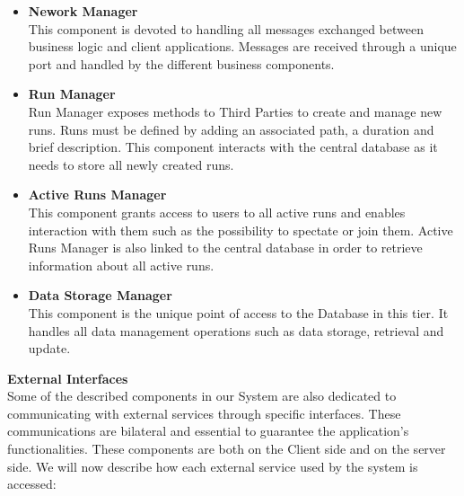 \documentclass[titlepage]{article}
\begin{document}
\begin{itemize}
        \item {\bf Nework Manager }\\
        This component is devoted to handling all messages exchanged between business logic and client applications. Messages are received through a unique port and handled by the different business components.
		\item {\bf Run Manager }\\
		Run Manager exposes methods to Third Parties  to create and manage new runs. Runs must be defined by adding an associated path, a duration and brief description. This component interacts with the central database as it needs to store all newly created runs.
		\item {\bf Active Runs Manager }\\
		This component grants access to users to all active runs and enables interaction with them such as the possibility to spectate or join them. Active Runs Manager is also linked to the central database in order to retrieve information about all active runs.
		\item {\bf Data Storage Manager }\\
		This component is the unique point of access to the Database in this tier. It handles all data management operations such as data storage, retrieval and update.\\
    \end{itemize}
{\bf External Interfaces }\\ 
Some of the described components in our System are also dedicated to communicating with external services through specific interfaces. These communications are bilateral and essential to guarantee the application’s functionalities. These components are both on the Client side and on the server side. We will now describe how each external service used by the system is accessed:
\end{document}
